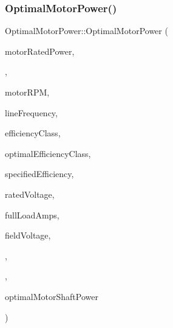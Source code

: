 \subsubsection{\texorpdfstring{Optimal\+Motor\+Power()}{OptimalMotorPower()}\hspace{0.1cm}{\footnotesize\ttfamily [2/3]}}
{\footnotesize\ttfamily Optimal\+Motor\+Power\+::\+Optimal\+Motor\+Power (\begin{DoxyParamCaption}\item[{double}]{motor\+Rated\+Power,  }\item[{double}]{,  }\item[{int}]{motor\+R\+PM,  }\item[{\hyperlink{class_motor_acee1bdf1b684ad36cb80dc2829d9fcee}{Motor\+::\+Line\+Frequency}}]{line\+Frequency,  }\item[{\hyperlink{class_motor_afa022971ae062406a9f588c601673d4e}{Motor\+::\+Efficiency\+Class}}]{efficiency\+Class,  }\item[{\hyperlink{class_motor_afa022971ae062406a9f588c601673d4e}{Motor\+::\+Efficiency\+Class}}]{optimal\+Efficiency\+Class,  }\item[{double}]{specified\+Efficiency,  }\item[{double}]{rated\+Voltage,  }\item[{double}]{full\+Load\+Amps,  }\item[{double}]{field\+Voltage,  }\item[{\hyperlink{class_field_data_a424e89914ba5684c01bb269dbe3312fd}{Field\+Data\+::\+Load\+Estimation\+Method}}]{,  }\item[{double}]{,  }\item[{double}]{optimal\+Motor\+Shaft\+Power }\end{DoxyParamCaption})\hspace{0.3cm}{\ttfamily [inline]}}

